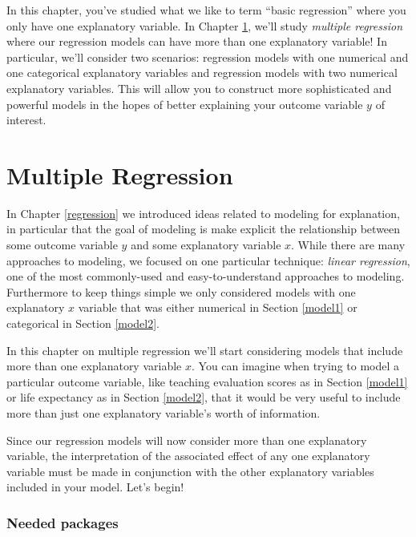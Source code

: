 \documentclass[12pt, krantz2,]{krantz}
\begin{document}
In this chapter, you've studied what we like to term ``basic regression'' where you only have one explanatory variable. In Chapter \ref{multiple-regression}, we'll study \emph{multiple regression} where our regression models can have more than one explanatory variable! In particular, we'll consider two scenarios: regression models with one numerical and one categorical explanatory variables and regression models with two numerical explanatory variables. This will allow you to construct more sophisticated and powerful models in the hopes of better explaining your outcome variable \(y\) of interest.

\hypertarget{multiple-regression}{%
\chapter{Multiple Regression}\label{multiple-regression}}

In Chapter \ref{regression} we introduced ideas related to modeling for explanation, in particular that the goal of modeling is make explicit the relationship between some outcome variable \(y\) and some explanatory variable \(x\). While there are many approaches to modeling, we focused on one particular technique: \emph{linear regression}, one of the most commonly-used and easy-to-understand approaches to modeling. Furthermore to keep things simple we only considered models with one explanatory \(x\) variable that was either numerical in Section \ref{model1} or categorical in Section \ref{model2}.

In this chapter on multiple regression we'll start considering models that include more than one explanatory variable \(x\). You can imagine when trying to model a particular outcome variable, like teaching evaluation scores as in Section \ref{model1} or life expectancy as in Section \ref{model2}, that it would be very useful to include more than just one explanatory variable's worth of information.

Since our regression models will now consider more than one explanatory variable, the interpretation of the associated effect of any one explanatory variable must be made in conjunction with the other explanatory variables included in your model. Let's begin!

\hypertarget{needed-packages-4}{%
\subsection*{Needed packages}\label{needed-packages-4}}
\end{document}
